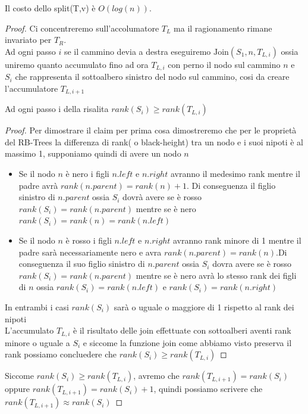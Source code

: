 \begin{definition}
    Il costo dello split(T,v) è $O(log(n))$.
\end{definition}

\begin{proof}
    Ci concentreremo sull'accolumatore $T_L$ ma il ragionamento rimane invariato per $T_R$.\\
    Ad ogni passo $i$ se il cammino devia a destra eseguiremo $\text{Join}(S_1, n, T_{L,i})$ ossia uniremo quanto accumulato fino ad ora $T_{L,i}$ con perno il nodo sul cammino $n$ e $S_i$ che rappresenta il sottoalbero sinistro del nodo sul cammino, cosi da creare l'accumulatore $T_{L,i+1}$

    \begin{kaobox}[frametitle=claim] 
    Ad ogni passo i della risalita $rank(S_i) \geq rank(T_{L,i})$ 
    \end{kaobox}

    \begin{proof}
        Per dimostrare il claim per prima cosa dimostreremo che per le proprietà del RB-Trees la differenza di rank( o black-height) tra un nodo e i suoi nipoti è al massimo 1, supponiamo quindi di avere un nodo $n$
        \begin{itemize}
            \item Se il nodo $n$ è nero i figli $n.left$ e $n.right$ avranno il medesimo rank mentre il padre avrà $rank(n.parent) = rank(n)+1$. Di conseguenza  il  figlio sinistro di $n.parent$ ossia $S_i$ dovrà avere se è rosso $rank(S_i) = rank(n.parent)$ mentre se è nero $rank(S_i) = rank(n) = rank(n.left)$ 
            \item Se il nodo $n$ è rosso i figli $n.left$ e $n.right$ avranno rank minore di 1 mentre il padre sarà necessariamente nero e avra $rank(n.parent) = rank(n)$.Di conseguenza il suo figlio sinistro di $n.parent$ ossia $S_i$ dovra avere se è rosso $rank(S_i) = rank(n.parent)$ mentre se è nero avrà lo stesso rank dei figli di $n$ ossia $rank(S_i) = rank(n.left)$ e $rank(S_i) = rank(n.right)$
        \end{itemize}
        In entrambi i casi $rank(S_i)$ sarà o uguale o maggiore di 1 rispetto al rank dei nipoti\\
        L'accumulato $T_{L,i}$ è il risultato delle join effettuate con sottoalberi aventi rank minore o uguale a $S_i$ e siccome la funzione join come abbiamo visto preserva il rank possiamo concluedere che $rank(S_i) \geq rank(T_{L,i})$
    \end{proof} 
    Siccome $rank(S_i) \geq rank(T_{L,i})$, avremo che $rank(T_{L,i+1})= rank(S_i)$ oppure $rank(T_{L,i+1})= rank(S_i)+1$, quindi possiamo scrivere che  $rank(T_{L,i+1}) \approx rank(S_i)$
    

\end{proof}
